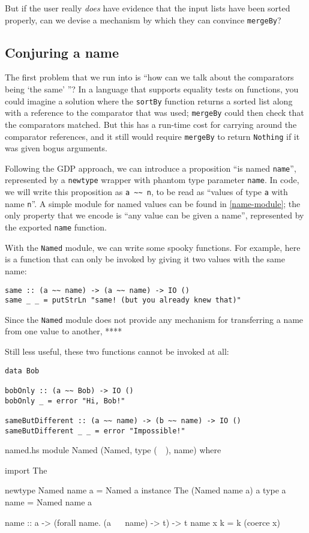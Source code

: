 \documentclass[format=sigplan, review=false, screen=true]{acmart}
\begin{document}
But if the user really \emph{does} have evidence that the input lists have
been sorted properly, can we devise a mechanism by which they can convince
\texttt{mergeBy}?

\subsection{Conjuring a name}
The first problem that we run into is ``how can we talk about the comparators
being `the same' ''? In a language that supports equality tests on functions,
you could imagine a solution where the \texttt{sortBy} function returns a sorted
list along with a reference to the comparator that was used; \texttt{mergeBy} could
then check that the comparators matched. But this has a run-time cost for carrying
around the comparator references, and it still would require \texttt{mergeBy} to
return \texttt{Nothing} if it was given bogus arguments.

Following the GDP approach, we can introduce a proposition ``is named \texttt{name}'',
represented by a \texttt{newtype} wrapper with phantom type parameter \texttt{name}.
In code, we will write this proposition as \verb|a ~~ n|, to be read as
``values of type \texttt{a} with name \texttt{n}''. A simple module for named values
can be found in \cref{name-module}; the only property that we encode is
``any value can be given a name'', represented by the exported \texttt{name} function.

With the \texttt{Named} module, we can write some spooky functions. For example,
here is a function that can only be invoked by giving it two values with the same
name:
\begin{verbatim}
same :: (a ~~ name) -> (a ~~ name) -> IO ()
same _ _ = putStrLn "same! (but you already knew that)"
\end{verbatim}
Since the \texttt{Named} module does not provide any mechanism for transferring
a name from one value to another, ****

Still less useful, these two functions cannot be invoked at all:
\begin{verbatim}
data Bob

bobOnly :: (a ~~ Bob) -> IO ()
bobOnly _ = error "Hi, Bob!"

sameButDifferent :: (a ~~ name) -> (b ~~ name) -> IO ()
sameButDifferent _ _ = error "Impossible!"
\end{verbatim}
\begin{filecontents*}{named.hs}
module Named (Named, type (~~), name) where

import The

newtype Named name a = Named a
instance The (Named name a) a
type a ~~ name = Named name a

name :: a -> (forall name. (a ~~ name) -> t) -> t
name x k = k (coerce x)
\end{filecontents*}
\end{document}
